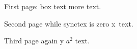 \hsize=3in \parindent=10pt
First page: \hbox{box} text\kern3pt more text.\par


\eject
{}
Second page while synctex is zero \hbox{x}\vrule\ text.

\eject
{}
Third page again \hbox{y} $a^2$ text.


\hbox{}\vbox{}\par
\bye
